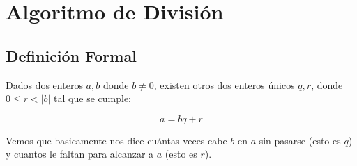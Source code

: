 \documentclass[12pt, fleqn]{report}                             %
\begin{document}
    \section{Algoritmo de División}

        \subsection*{Definición Formal}

            Dados dos enteros $a, b$ donde $b \neq 0$, existen otros dos 
            enteros únicos $q, r$, donde $0 \leq r < |b|$ tal que se cumple:

            \begin{equation}
                a = bq+r
            \end{equation}

            Vemos que basicamente nos dice cuántas veces cabe $b$ en $a$ sin pasarse (esto 
            es $q$) y cuantos le faltan para alcanzar a $a$ (esto es $r$).
\end{document}
